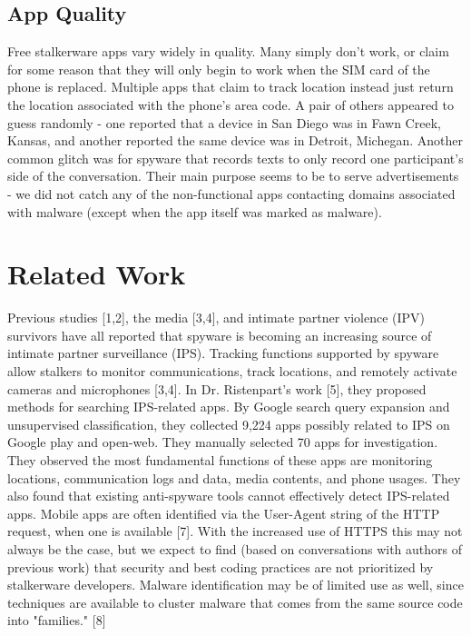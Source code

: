 \documentclass[acmtog]{acmart}
\begin{document}
\subsection{App Quality}

Free stalkerware apps vary widely in quality. Many simply don't work, or claim 
for some reason that they will only begin to work when the SIM card of the 
phone is replaced. Multiple apps that claim to track location instead just 
return the location associated with the phone's area code. A pair of others 
appeared to guess randomly - one reported that a device in San Diego was in 
Fawn Creek, Kansas, and another reported the same device was in Detroit, 
Michegan. Another common glitch was for spyware that records texts to only 
record one participant's side of the conversation. Their main purpose seems to 
be to serve 
advertisements - we did not 
catch any of the non-functional apps contacting domains associated with malware 
(except when the app itself was marked as malware). 

\section{Related Work}
Previous studies [1,2], the media [3,4], and intimate partner violence (IPV) 
survivors have all reported that spyware is becoming an increasing source of 
intimate partner surveillance (IPS). Tracking functions supported by spyware 
allow stalkers to monitor communications, track locations, and remotely 
activate cameras and microphones [3,4]. In Dr. Ristenpart's work [5], they 
proposed methods for searching IPS-related apps. By Google search query 
expansion and unsupervised classification, they collected 9,224 apps possibly 
related to IPS on Google play and open-web. They manually selected 70 apps for 
investigation. They observed the most fundamental functions of these apps are 
monitoring locations, communication logs and data, media contents, and phone 
usages. They also found that existing anti-spyware tools cannot effectively 
detect IPS-related apps.
Mobile apps are often identified via the User-Agent string of the HTTP request, 
when one is available [7]. With the increased use of HTTPS this may not always 
be the case, but we expect to find (based on conversations with authors of 
previous work) that security and best coding practices are not prioritized by 
stalkerware developers. Malware identification may be of limited use as well, 
since techniques are available to cluster malware that comes from the same 
source code into "families." [8]
\end{document}
